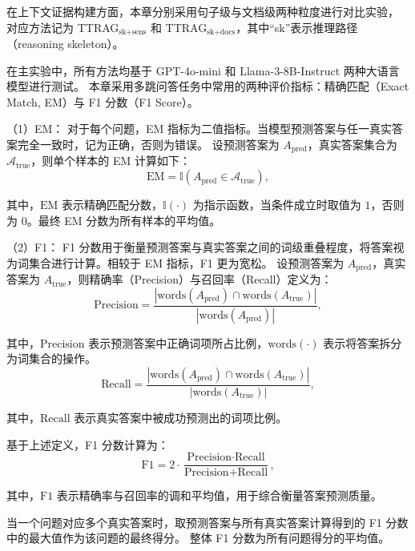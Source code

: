 在上下文证据构建方面，本章分别采用句子级与文档级两种粒度进行对比实验，
对应方法记为 TTRAG$_{\text{sk+sens}}$ 和 TTRAG$_{\text{sk+docs}}$，其中“sk”表示推理路径（reasoning skeleton）。

在主实验中，所有方法均基于 GPT-4o-mini 和 Llama-3-8B-Instruct 两种大语言模型进行测试。
本章采用多跳问答任务中常用的两种评价指标：精确匹配（Exact Match, EM）与 F1 分数（F1 Score）。

（1）EM：
对于每个问题，EM 指标为二值指标。当模型预测答案与任一真实答案完全一致时，记为正确，否则为错误。
设预测答案为 $A_{\text{pred}}$，真实答案集合为 $\mathcal{A}_{\text{true}}$，则单个样本的 EM 计算如下：
\begin{equation}
\text{EM} = \mathbb{I}(A_{\text{pred}} \in \mathcal{A}_{\text{true}}),
\end{equation}

\noindent 其中，$\text{EM}$ 表示精确匹配分数，$\mathbb{I}(\cdot)$ 为指示函数，当条件成立时取值为 $1$，否则为 $0$。最终 EM 分数为所有样本的平均值。

（2）F1：
F1 分数用于衡量预测答案与真实答案之间的词级重叠程度，将答案视为词集合进行计算。相较于 EM 指标，F1 更为宽松。
设预测答案为 $A_{\text{pred}}$，真实答案为 $A_{\text{true}}$，则精确率（Precision）与召回率（Recall）定义为：
\begin{equation}
\text{Precision} = \frac{|\text{words}(A_{\text{pred}}) \cap \text{words}(A_{\text{true}})|}{|\text{words}(A_{\text{pred}})|},
\end{equation}

\noindent 其中，$\text{Precision}$ 表示预测答案中正确词项所占比例，$\text{words}(\cdot)$ 表示将答案拆分为词集合的操作。
\begin{equation}
\text{Recall} = \frac{|\text{words}(A_{\text{pred}}) \cap \text{words}(A_{\text{true}})|}{|\text{words}(A_{\text{true}})|},
\end{equation}

\noindent 其中，$\text{Recall}$ 表示真实答案中被成功预测出的词项比例。

基于上述定义，F1 分数计算为：
\begin{equation}
\text{F1} = 2 \cdot \frac{\text{Precision} \cdot \text{Recall}}{\text{Precision} + \text{Recall}},
\end{equation}

\noindent 其中，$\text{F1}$ 表示精确率与召回率的调和平均值，用于综合衡量答案预测质量。

当一个问题对应多个真实答案时，取预测答案与所有真实答案计算得到的 F1 分数中的最大值作为该问题的最终得分。
整体 F1 分数为所有问题得分的平均值。

